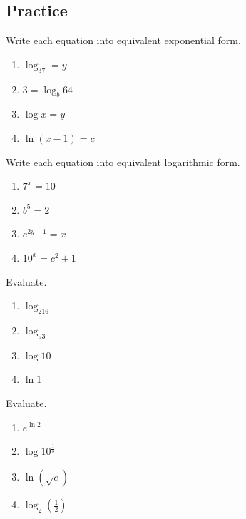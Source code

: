 \subsection{Practice}

\begin{exercise}

Write each equation into equivalent exponential form.

\begin{enumerate}
\item
  \(\log_37=y\)
\item
  \(3=\log_b64\)
\item
  \(\log x=y\)
\item
  \(\ln(x-1)=c\)
\end{enumerate}

\end{exercise}

\begin{exercise}

Write each equation into equivalent logarithmic form.

\begin{enumerate}
\item
  \(7^x=10\)
\item
  \(b^5=2\)
\item
  \(e^{2y-1}=x\)
\item
  \(10^x=c^2+1\)
\end{enumerate}

\end{exercise}

\begin{exercise}

Evaluate.

\begin{enumerate}
\item
  \(\log_216\)
\item
  \(\log_93\)
\item
  \(\log 10\)
\item
  \(\ln 1\)
\end{enumerate}

\end{exercise}

\begin{exercise}

Evaluate.

\begin{enumerate}
\item
  \(e^{\ln 2}\)
\item
  \(\log 10^{\frac13}\)
\item
  \(\ln(\sqrt{e})\)
\item
  \(\log_2(\frac12)\)
\end{enumerate}

\end{exercise}

